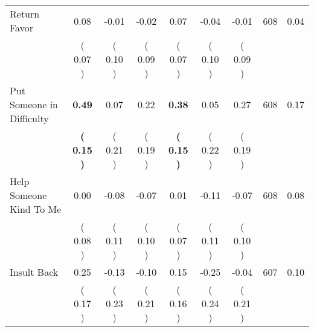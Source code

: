 \begin{tabular}{lcccccccc}
Return Favor &      0.08 &     -0.01 &     -0.02 &      0.07 &     -0.04 &     -0.01 & 608 &       0.04 \\ 
 & (     0.07 ) & (     0.10 ) & (     0.09 ) & (     0.07 ) & (     0.10 ) & (     0.09 ) & \\
Put Someone in Difficulty & \textbf{     0.49} &      0.07 &      0.22 & \textbf{     0.38} &      0.05 &      0.27 & 608 &       0.17 \\ 
 & \textbf{(     0.15 )} & (     0.21 ) & (     0.19 ) & \textbf{(     0.15 )} & (     0.22 ) & (     0.19 ) & \\
Help Someone Kind To Me &      0.00 &     -0.08 &     -0.07 &      0.01 &     -0.11 &     -0.07 & 608 &       0.08 \\ 
 & (     0.08 ) & (     0.11 ) & (     0.10 ) & (     0.07 ) & (     0.11 ) & (     0.10 ) & \\
Insult Back &      0.25 &     -0.13 &     -0.10 &      0.15 &     -0.25 &     -0.04 & 607 &       0.10 \\ 
 & (     0.17 ) & (     0.23 ) & (     0.21 ) & (     0.16 ) & (     0.24 ) & (     0.21 ) & \\
\bottomrule
\end{tabular}
